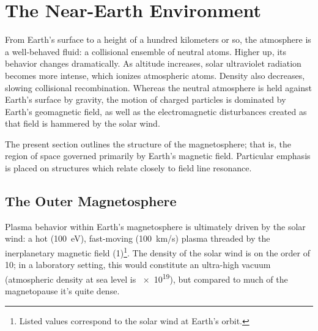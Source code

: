 


\chapter{The Near-Earth Environment}
  \label{ch_environment}


From Earth's surface to a height of a hundred kilometers or so, the atmosphere is a well-behaved fluid: a collisional ensemble of neutral atoms. Higher up, its behavior changes dramatically. As altitude increases, solar ultraviolet radiation becomes more intense, which ionizes atmospheric atoms. Density also decreases, slowing collisional recombination. Whereas the neutral atmosphere is held against Earth's surface by gravity, the motion of charged particles is dominated by Earth's geomagnetic field, as well as the electromagnetic disturbances created as that field is hammered by the solar wind. 


The present section outlines the structure of the magnetosphere; that is, the region of space governed primarily by Earth's magnetic field. Particular emphasis is placed on structures which relate closely to field line resonance. 

\section{The Outer Magnetosphere}
  \label{sec_outer}

Plasma behavior within Earth's magnetosphere is ultimately driven by the solar wind: a hot (\about\SI{100}{\eV}), fast-moving (\about\SI{100}{\km/\s}) plasma threaded by the inerplanetary magnetic field (\about\SI{1}{\nT})\footnote{Listed values correspond to the solar wind at Earth's orbit. }. The density of the solar wind is on the order of \SI{10}{\percc}; in a laboratory setting, this would constitute an ultra-high vacuum (atmospheric density at sea level is \about\SI{e19}{\percc}), but compared to much of the magnetopause it's quite dense. 

